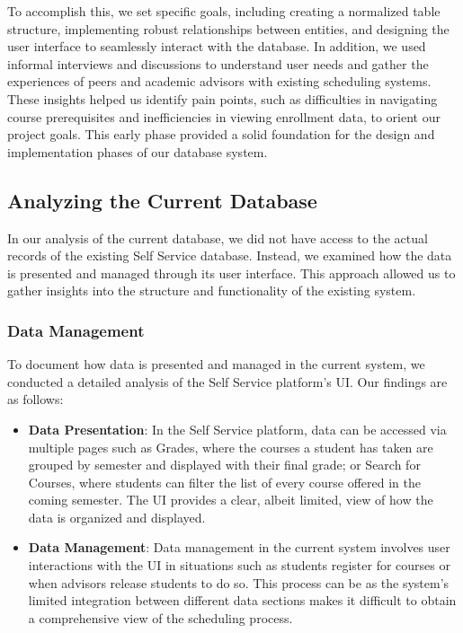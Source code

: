 \documentclass[12pt]{article}
\begin{document}
To accomplish this, we set specific goals, including creating a normalized table structure, implementing robust relationships between entities, and designing the user interface to seamlessly interact with the database. In addition, we used informal interviews and discussions to understand user needs and gather the experiences of peers and academic advisors with existing scheduling systems. These insights helped us identify pain points, such as difficulties in navigating course prerequisites and inefficiencies in viewing enrollment data, to orient our project goals. This early phase provided a solid foundation for the design and implementation phases of our database system.

\subsection{Analyzing the Current Database}
In our analysis of the current database, we did not have access to the actual records of the existing Self Service database. Instead, we examined how the data is presented and managed through its user interface. This approach allowed us to gather insights into the structure and functionality of the existing system.

\subsubsection*{Data Management}

To document how data is presented and managed in the current system, we conducted a detailed analysis of the Self Service platform's UI. Our findings are as follows:

\begin{itemize}
  \item  \textbf{Data Presentation}: In the Self Service platform, data can be accessed via multiple pages such as Grades, where the courses a student has taken are grouped by semester and displayed with their final grade; or Search for Courses, where students can filter the list of every course offered in the coming semester. The UI provides a clear, albeit limited, view of how the data is organized and displayed.
  \item \textbf{Data Management}: Data management in the current system involves user interactions with the UI in situations such as students register for courses or when advisors release students to do so. This process can be as the system's limited integration between different data sections makes it difficult to obtain a comprehensive view of the scheduling process.
\end{itemize}
\end{document}
